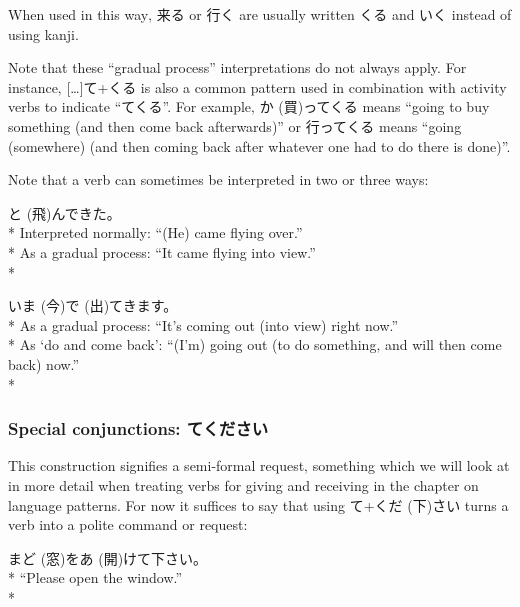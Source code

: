 \documentclass[11pt, b5paper, twoside, openright, onecolumn]{book}
\makeatletter
\newcommand*{\rubystack}[2]{{\relscale{0.5}%
  \begin{tabular}[b]{@{}c@{}}%
    {#1}\\%
   {\textscale{2}{#2}}%
  \end{tabular}}%
}
\DeclareRobustCommand*{\ruby}[2]{%
  \mbox{%
    \setlength{\parskip}{0ex}%
    \BeginAccSupp{method=pdfstringdef,ActualText={#1}}%
      \rubystack{\phantom{#2}}{#1}%
      \llap{%
        \rubystack{#2}{\phantom{#1}}%
      }%
    \EndAccSupp{}%
  }%
}
\renewcommand*{\ruby}[2]{#2 (#1)}%
\newenvironment{exampleblock}{
\setlength{\parindent}{0.6in}
\begin{minipage}[t]{\dimexpr\textwidth-\parindent}}
{\end{minipage}}
\makeatother
\begin{document}
When used in this way‚ 来る or 行く are usually written くる and いく instead of using kanji.

Note that these “gradual process” interpretations do not always apply. For instance‚ […]て+くる is also a common pattern used in combination with activity verbs to indicate “てくる”. For example‚ \ruby{買}{か}ってくる means “going to buy something (and then come back afterwards)” or 行ってくる means “going (somewhere) (and then coming back after whatever one had to do there is done)”.

Note that a verb can sometimes be interpreted in two or three ways:

\vspace{0.4cm}
\begin{exampleblock}
\ruby{飛}{と}んできた。 \\* 
Interpreted normally: “(He) came flying over.” \\* 
As a gradual process: “It came flying into view.” \\* 
\end{exampleblock}
\vspace{0.2cm}

\begin{exampleblock}
\ruby{今}{いま}\ruby{出}{で}てきます。 \\* 
As a gradual process: “It’s coming out (into view) right now.” \\* 
As ‘do and come back’: “(I’m) going out (to do something‚ and will then come back) now.” \\* 
\end{exampleblock}
\subsubsection{Special conjunctions: てください}


This construction signifies a semi-formal request‚ something which we will look at in more detail when treating verbs for giving and receiving in the chapter on language patterns. For now it suffices to say that using て+\ruby{下}{くだ}さい turns a verb into a polite command or request:

\vspace{0.4cm}
\begin{exampleblock}
\ruby{窓}{まど}を\ruby{開}{あ}けて下さい。 \\* 
“Please open the window.” \\* 
\end{exampleblock}
\vspace{0.2cm}
\end{document}
